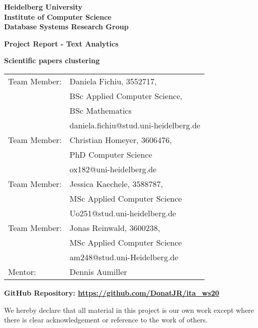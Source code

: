 \documentclass[
     12pt,         %
     a4paper,      %
     BCOR10mm,     %
     DIV14,        %
     ]{article}
\begin{document}
\begin{titlepage}


\begin{center}
\textbf{ 
\Large Heidelberg University\\
\smallskip
\Large Institute of Computer Science\\
\smallskip
\Large Database Systems Research Group\\
\smallskip
}

\vspace{2cm}

\textbf{\large Project Report - Text Analytics}

\vspace{0.5\baselineskip}
{\huge
\textbf{Scientific papers clustering}
}
\end{center}

\vfill 

{\large
\begin{tabular}[l]{ll}
Team Member: & Daniela Fichiu, 3552717,\\& BSc Applied Computer Science,\\
  & BSc Mathematics\\
  & daniela.fichiu@stud.uni-heidelberg.de\\
Team Member: & Christian Homeyer, 3606476,\\ & PhD Computer Science \\
  & ox182@uni-heidelberg.de\\
Team Member: & Jessica Kaechele, 3588787,\\ & MSc Applied Computer Science\\
  & Uo251@stud.uni-heidelberg.de\\
Team Member: & Jonas Reinwald, 3600238, \\ & MSc Applied Computer Science\\
  & am248@stud.uni-Heidelberg.de\\
Mentor: & Dennis Aumiller
  
\end{tabular}
}
\vspace*{1cm}

{
  \textbf{GitHub Repository: \url{https://github.com/DonatJR/ita_ws20}}
}
\vspace*{.5cm}

\begin{center}
{
We  hereby  declare  that  all  material  in  this  project  is  our  own  work except where there is clear acknowledgement or reference to the work of others. } 
\end{center}


\end{titlepage}


% 


\newpage
\tableofcontents

\listoffigures
\listoftables

\newpage










\end{document}
